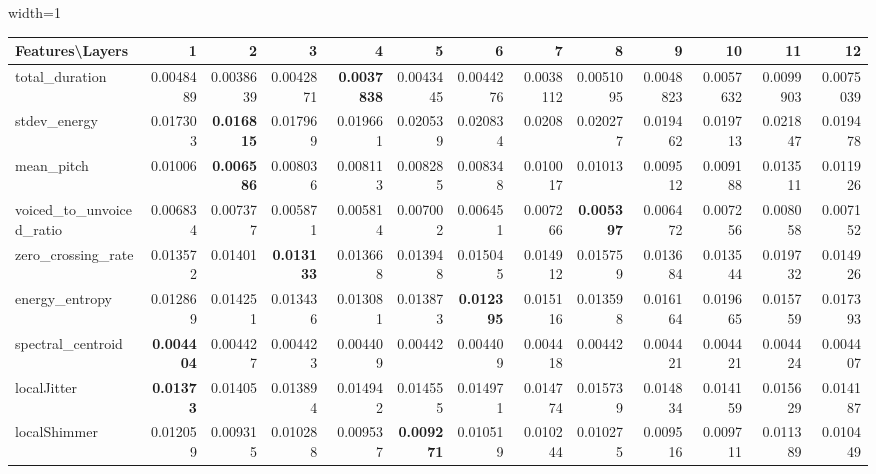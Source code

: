 \documentclass[sigconf]{acmart}
\newcommand{\wv}{wav2vec2.0\xspace}
\begin{document}
\begin{table*}[]
\begin{adjustbox}{width=1\textwidth}
\begin{tabular}{@{}l|rrrrrrrrrrrr@{}}
\toprule
\textbf{Features\textbackslash{}Layers} & 1 & 2 & 3 & 4 & 5 & 6 & 7 & 8 & 9 & 10 & 11 & 12 \\ \midrule
total\_duration & 0.0048489 & 0.0038639 & 0.0042871 & \textbf{0.0037838} & 0.0043445 & 0.0044276 & 0.0038112 & 0.0051095 & 0.0048823 & 0.0057632 & 0.0099903 & 0.0075039 \\
stdev\_energy & 0.017303 & \textbf{0.016815} & 0.017969 & 0.019661 & 0.020539 & 0.020834 & 0.0208 & 0.020277 & 0.019462 & 0.019713 & 0.021847 & 0.019478 \\
mean\_pitch & 0.01006 & \textbf{0.006586} & 0.008036 & 0.008113 & 0.008285 & 0.008348 & 0.010017 & 0.01013 & 0.009512 & 0.009188 & 0.013511 & 0.011926 \\
voiced\_to\_unvoiced\_ratio & 0.006834 & 0.007377 & 0.005871 & 0.005814 & 0.007002 & 0.006451 & 0.007266 & \textbf{0.005397} & 0.006472 & 0.007256 & 0.008058 & 0.007152 \\
zero\_crossing\_rate & 0.013572 & 0.01401 & \textbf{0.013133} & 0.013668 & 0.013948 & 0.015045 & 0.014912 & 0.015759 & 0.013684 & 0.013544 & 0.019732 & 0.014926 \\
energy\_entropy & 0.012869 & 0.014251 & 0.013436 & 0.013081 & 0.013873 & \textbf{0.012395} & 0.015116 & 0.013598 & 0.016164 & 0.019665 & 0.015759 & 0.017393 \\
spectral\_centroid & \textbf{0.004404} & 0.004427 & 0.004423 & 0.004409 & 0.00442 & 0.004409 & 0.004418 & 0.00442 & 0.004421 & 0.004421 & 0.004424 & 0.004407 \\
localJitter & \textbf{0.01373} & 0.01405 & 0.013894 & 0.014942 & 0.014555 & 0.014971 & 0.014774 & 0.015739 & 0.014834 & 0.014159 & 0.015629 & 0.014187 \\
localShimmer & 0.012059 & 0.009315 & 0.010288 & 0.009537 & \textbf{0.009271} & 0.010519 & 0.010244 & 0.010275 & 0.009516 & 0.009711 & 0.011389 & 0.010449\\ \bottomrule
\end{tabular}
\end{adjustbox}
\vspace{1 mm}
\caption{\label{nsAudio_W} \small  Results (MSE) for audio features on {\wv} for native spontaneous speech corpus (Mozilla Common Voice)}

\end{table*}
\end{document}
